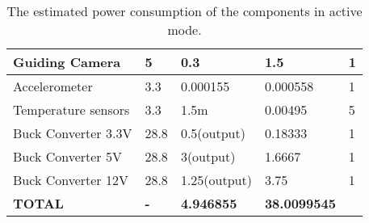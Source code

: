 \begin{center}
\begin{table}[H]
\begin{tabular}{|m{}|m{}|m{}|m{}|m{}|}
Guiding Camera          & 5                               & 0.3                                 & 1.5                          & 1                 \\ \hline
Accelerometer           & 3.3                             & 0.000155                            & 0.000558                     & 1                 \\ \hline
Temperature sensors     & 3.3                             & 1.5m                                & 0.00495                      & 5                 \\ \hline
Buck Converter 3.3V     & 28.8                            & 0.5(output)                         & 0.18333                      & 1                 \\ \hline
Buck Converter 5V       & 28.8                            & 3(output)                           & 1.6667                       & 1                 \\ \hline
Buck Converter 12V      & 28.8                            & 1.25(output)                        & 3.75                         & 1                 \\ \hline
\textbf{TOTAL}          & \textbf{-}                      & \textbf{4.946855}                   & \textbf{38.0099545}           &                   \\ \hline
\end{tabular}
\caption{The estimated power consumption of the components in active mode.}
\end{table}
\label{tab: power consumption}
\end{center}




\raggedbottom
